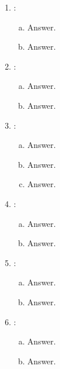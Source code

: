 \documentclass[a4paper,9pt,fleqn]{article}
\begin{document}
\begin{enumerate}[{Task} 1]
\begin{enumerate}[a)]
The answer is given by the name server {.168.192.in-addr.arpa}. The
hostname that was given is {\outp Hampus-MBP.huawei.com}.
\end{enumerate}

\item :
\begin{enumerate}[a)]
\item 
Answer.  
\item 
Answer.
\end{enumerate}

\item :
\begin{enumerate}[a)]
\item 
Answer.  
\item 
Answer.
\end{enumerate}

\item :
\begin{enumerate}[a)]
\item 
Answer.  
\item 
Answer. 
\item 
Answer.
\end{enumerate}

\item :
\begin{enumerate}[a)]
\item 
Answer.  
\item 
Answer.
\end{enumerate}

\item :
\begin{enumerate}[a)]
\item 
Answer.  
\item 
Answer.
\end{enumerate}

\item :
\begin{enumerate}[a)]
\item 
Answer.  
\item 
Answer.
\end{enumerate}

\end{enumerate}
\end{document}
